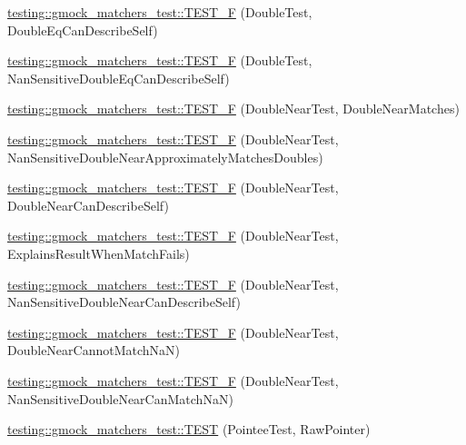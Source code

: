 \begin{DoxyCompactItemize}
\item 
\hyperlink{namespacetesting_1_1gmock__matchers__test_a5975fb5a50e5364fe21422093680a559}{testing\+::gmock\+\_\+matchers\+\_\+test\+::\+T\+E\+S\+T\+\_\+F} (Double\+Test, Double\+Eq\+Can\+Describe\+Self)
\item 
\hyperlink{namespacetesting_1_1gmock__matchers__test_a2d101d1823617f9b1346ee64cdce5216}{testing\+::gmock\+\_\+matchers\+\_\+test\+::\+T\+E\+S\+T\+\_\+F} (Double\+Test, Nan\+Sensitive\+Double\+Eq\+Can\+Describe\+Self)
\item 
\hyperlink{namespacetesting_1_1gmock__matchers__test_ab2949593472038919b8f3e1b2da204bc}{testing\+::gmock\+\_\+matchers\+\_\+test\+::\+T\+E\+S\+T\+\_\+F} (Double\+Near\+Test, Double\+Near\+Matches)
\item 
\hyperlink{namespacetesting_1_1gmock__matchers__test_add8765ad2bb98f4b064ee77b4c21a612}{testing\+::gmock\+\_\+matchers\+\_\+test\+::\+T\+E\+S\+T\+\_\+F} (Double\+Near\+Test, Nan\+Sensitive\+Double\+Near\+Approximately\+Matches\+Doubles)
\item 
\hyperlink{namespacetesting_1_1gmock__matchers__test_a31d14a68cacbaab3fafd26247cc11f9c}{testing\+::gmock\+\_\+matchers\+\_\+test\+::\+T\+E\+S\+T\+\_\+F} (Double\+Near\+Test, Double\+Near\+Can\+Describe\+Self)
\item 
\hyperlink{namespacetesting_1_1gmock__matchers__test_a4250d3de38128f3452a0a9e93173bdb4}{testing\+::gmock\+\_\+matchers\+\_\+test\+::\+T\+E\+S\+T\+\_\+F} (Double\+Near\+Test, Explains\+Result\+When\+Match\+Fails)
\item 
\hyperlink{namespacetesting_1_1gmock__matchers__test_ad147bef4b26c0a060cb4d25fe517a3e3}{testing\+::gmock\+\_\+matchers\+\_\+test\+::\+T\+E\+S\+T\+\_\+F} (Double\+Near\+Test, Nan\+Sensitive\+Double\+Near\+Can\+Describe\+Self)
\item 
\hyperlink{namespacetesting_1_1gmock__matchers__test_a9542b930e1de4d087a8655855edcc13c}{testing\+::gmock\+\_\+matchers\+\_\+test\+::\+T\+E\+S\+T\+\_\+F} (Double\+Near\+Test, Double\+Near\+Cannot\+Match\+NaN)
\item 
\hyperlink{namespacetesting_1_1gmock__matchers__test_a7c8d850697cb6cc030a4b05eeecffb72}{testing\+::gmock\+\_\+matchers\+\_\+test\+::\+T\+E\+S\+T\+\_\+F} (Double\+Near\+Test, Nan\+Sensitive\+Double\+Near\+Can\+Match\+NaN)
\item 
\hyperlink{namespacetesting_1_1gmock__matchers__test_ad6a13303d164fa9ca035a137840b78cb}{testing\+::gmock\+\_\+matchers\+\_\+test\+::\+T\+E\+ST} (Pointee\+Test, Raw\+Pointer)
\item 

\end{DoxyCompactItemize}

